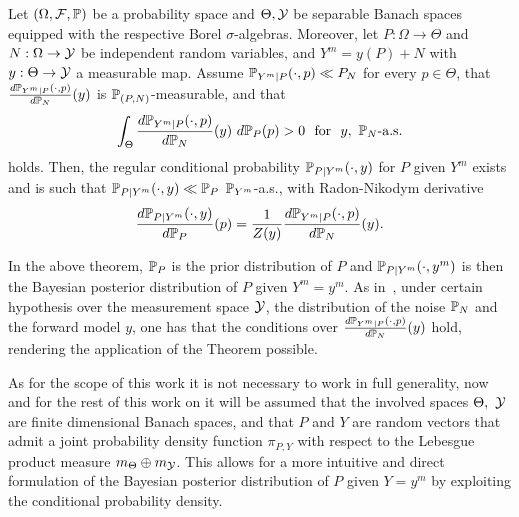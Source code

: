 \begin{thm}
    Let $ (\Omega, \mathcal F , \mathbb P) $ be a probability space and $\Theta, \mathcal Y$ be separable Banach spaces equipped with the respective Borel $\sigma$-algebras. 
    Moreover, let $P : \Omega \rightarrow \Theta$ and $N:\Omega \rightarrow \mathcal Y$ be independent random variables, and $ Y^m = y(P) + N$ with $y: \Theta \rightarrow \mathcal Y$ a measurable map. \newline
    Assume $\mathbb P_{Y^m\mid P}(\cdot, p) \ll P_N$ for every $p \in \Theta$, that $\frac{d \mathbb P_{Y^m\mid P}(\cdot, p)}{d\mathbb P_N}(y) $ is $\mathbb P_{(P,N)}$-measurable, and that 
    \[
        \int_\Theta \frac{d \mathbb P_{Y^m\mid P}(\cdot, p)}{d\mathbb P_N}(y) \ d\mathbb P_P(p) > 0 \ \text{ for }  \ y, \ \mathbb P_N \text{-a.s.}
    \]
    holds.
    Then, the regular conditional probability $\mathbb P_{P\mid Y^m}(\cdot,y)$ for $P$ given $Y^m$ exists and is such that $\mathbb P_{P\mid Y^m}(\cdot, y) \ll \mathbb P _P$ $\mathbb P_{Y^m}$-a.s., with Radon-Nikodym derivative
    \begin{equation}\label{eq:infdimBayes}
        \frac{d\mathbb P_{P\mid Y^m}(\cdot, y)}{d\mathbb P_P}(p) = \frac{1}{Z(y)}\frac{d\mathbb P_{Y^m\mid P}(\cdot, p)}{d\mathbb P_{N}}(y).
    \end{equation}
\end{thm}

In the above theorem, $\mathbb P_P$ is the prior distribution of $P$ and $\mathbb P_{P \mid Y^m}(\cdot, y^m)$ is then the Bayesian posterior distribution of $P$ given $Y^m=y^m$.
As in~\cite[Theorem 6.31]{Stuart2010}, under certain hypothesis over the measurement space $\mathcal Y$, the distribution of the noise $\mathbb P_N$ and the forward model $y$, one has that the conditions over $\frac{d \mathbb P_{Y^m\mid P}(\cdot, p)}{d\mathbb P_N}(y)$ hold, rendering the application of the Theorem possible. \medskip

As for the scope of this work it is not necessary to work in full generality, now and for the rest of this work on it will be assumed that the involved spaces $\Theta, \  \mathcal Y$ are finite dimensional Banach spaces, and that $P$ and $Y$ are random vectors that admit a joint probability density function $\pi_{P,Y}$ with respect to the Lebesgue product measure $m_\Theta \oplus m_\mathcal Y$. 
This allows for a more intuitive and direct formulation of the Bayesian posterior distribution of $P$ given $Y=y^m$ by exploiting the conditional probability density.

